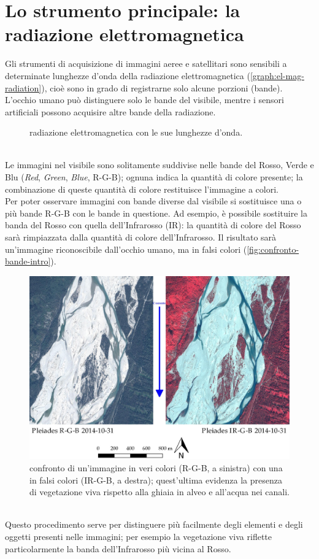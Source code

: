 \section{Lo strumento principale: la radiazione elettromagnetica}
Gli strumenti di acquisizione di immagini aeree e satellitari sono sensibili a determinate lunghezze d'onda della radiazione elettromagnetica (\vref{graph:el-mag-radiation}), cioè sono in grado di registrarne solo alcune porzioni (bande).
L'occhio umano può distinguere solo le bande del visibile, mentre i sensori artificiali possono acquisire altre bande della radiazione.
%
\begin{figure}
	\centering
	
	\caption{radiazione elettromagnetica con le sue lunghezze d'onda.}
	\label{graph:el-mag-radiation}
\end{figure}
%
\\
Le immagini nel visibile sono solitamente suddivise nelle bande del Rosso, Verde e Blu (\emph{Red}, \emph{Green}, \emph{Blue}, R-G-B); ognuna indica la quantità di colore presente; la combinazione di queste quantità di colore restituisce l'immagine a colori.
\\
Per poter osservare immagini con bande diverse dal visibile si sostituisce una o più bande R-G-B con le bande in questione.
Ad esempio, è possibile sostituire la banda del Rosso con quella dell'Infrarosso (IR): la quantità di colore del Rosso sarà rimpiazzata dalla quantità di colore dell'Infrarosso.
Il risultato sarà un'immagine riconoscibile dall'occhio umano, ma in falsi colori (\vref{fig:confronto-bande-intro}).
%
\begin{figure}
	\centering
	\includegraphics[width=\textwidth]{files/confronto_bande_intro.jpeg}
	\caption[confronto immagini R-G-B e IR-R-G]{confronto di un'immagine in veri colori (R-G-B, a sinistra) con una in falsi colori (IR-G-B, a destra); quest'ultima evidenza la presenza di vegetazione viva rispetto alla ghiaia in alveo e all'acqua nei canali.}
	\label{fig:confronto-bande-intro}
\end{figure}
%
\\
Questo procedimento serve per distinguere più facilmente degli elementi e degli oggetti presenti nelle immagini; per esempio la vegetazione viva riflette particolarmente la banda dell'Infrarosso più vicina al Rosso.



